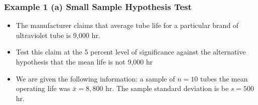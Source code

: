 
\begin{frame}
\frametitle{Example 1 (a) Small Sample Hypothesis Test}
\large
\begin{itemize}

\item The manufacturer claims that average tube life for a particular brand of ultraviolet tube
is 9,000 hr. \item Test this claim at the 5 percent level of significance against the alternative hypothesis
that the mean life is not 9,000 hr \item We are given the following information:  a sample of $n = 10$ tubes the mean operating
life was $\bar{x} = 8,800$ hr. The sample standard deviation is be $s = 500$ hr.
\end{itemize}
\end{frame}


